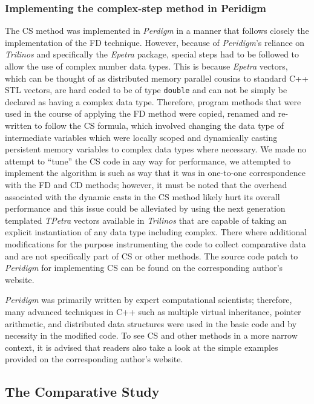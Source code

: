 \documentclass[preprint,12pt]{elsarticle}
\begin{document}
\subsubsection{Implementing the complex-step method in Peridigm} 
%
The CS method was implemented in \emph{Perdigm} in a manner that follows closely the implementation of the FD technique.  However, because of \emph{Peridigm}'s reliance on \emph{Trilinos} and specifically the \emph{Epetra} package, special steps had to be followed to allow the use of complex number data types.  This is because \emph{Epetra} vectors, which can be thought of as distributed memory parallel cousins to standard C++ STL vectors, are hard coded to be of type {\tt double} and can not be simply be declared as having a complex data type. Therefore, program methods that were used in the course of applying the FD method were copied, renamed and re-written to follow the CS formula, which involved changing the data type of intermediate variables which were locally scoped and dynamically casting persistent memory variables to complex data types where necessary. We made no attempt to ``tune'' the CS code in any way for performance, we attempted to implement the algorithm is such as way that it was in one-to-one correspondence with the FD and CD methods; however, it must be noted that the overhead associated with the dynamic casts in the CS method likely hurt its overall performance and this issue could be alleviated by using the next generation templated \emph{TPetra} vectors available in \emph{Trilinos} that are capable of taking an explicit instantiation of any data type including complex.  There where additional modifications for the purpose instrumenting the code to collect comparative data and are not specifically part of CS or other methods. The source code patch to \emph{Peridigm} for implementing CS can be found on the corresponding author's website.  

\emph{Peridigm} was primarily written by expert computational scientists; therefore, many advanced techniques in C++ such as multiple virtual inheritance, pointer arithmetic, and distributed data structures were used in the basic code and by necessity in the modified code.  To see CS and other methods in a more narrow context, it is advised that readers also take a look at the simple examples provided on the corresponding author's website.

\subsection{The Comparative Study} 
\label{tcs}
\end{document}
